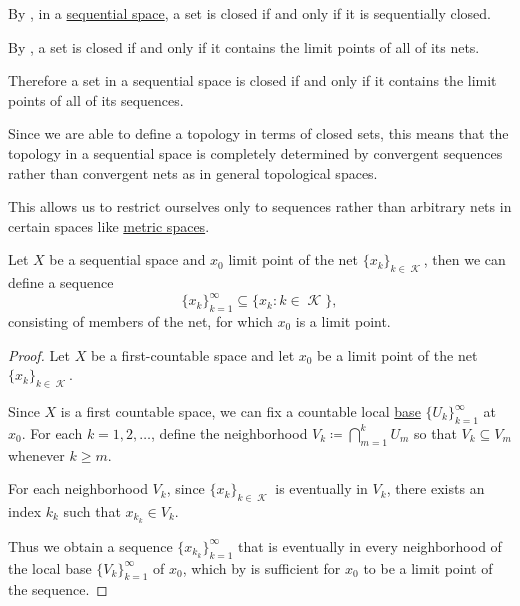 \begin{remark}\label{rem:sequential_spaces}
  By , in a \hyperref[def:sequential_space]{sequential space}, a set is closed if and only if it is sequentially closed.

  By , a set is closed if and only if it contains the limit points of all of its nets.

  Therefore a set in a sequential space is closed if and only if it contains the limit points of all of its sequences.

  Since we are able to define a topology in terms of closed sets, this means that the topology in a sequential space is completely determined by convergent sequences rather than convergent nets as in general topological spaces.

  This allows us to restrict ourselves only to sequences rather than arbitrary nets in certain spaces like \hyperref[def:metric_space]{metric spaces}.
\end{remark}

\begin{lemma}\label{thm:sequential_space_convergence}
  Let \( X \) be a sequential space and \( x_0 \) limit point of the net \( \{ x_k \}_{k \in \mscrK} \), then we can define a sequence
  \begin{equation*}
    \{ x_k \}_{k=1}^\infty \subseteq \{ x_k \colon k \in \mscrK \},
  \end{equation*}
  consisting of members of the net, for which \( x_0 \) is a limit point.
\end{lemma}
\begin{proof}
  Let \( X \) be a first-countable space and let \( x_0 \) be a limit point of the net \( \{ x_k \}_{k \in \mscrK} \).

  Since \( X \) is a first countable space, we can fix a countable local \hyperref[def:topological_local_base]{base} \( \{ U_k \}_{k=1}^\infty \) at \( x_0 \). For each \( k = 1, 2, \ldots \), define the neighborhood \( V_k \coloneqq \bigcap_{m=1}^k U_m \) so that \( V_k \subseteq V_m \) whenever \( k \geq m \).

  For each neighborhood \( V_k \), since \( \{ x_k \}_{k \in \mscrK} \) is eventually in \( V_k \), there exists an index \( k_k \) such that \( x_{k_k} \in V_k \).

  Thus we obtain a sequence \( \{ x_{k_k} \}_{k=1}^\infty \) that is eventually in every neighborhood of the local base \( \{ V_k \}_{k=1}^\infty \) of \( x_0 \), which by  is sufficient for \( x_0 \) to be a limit point of the sequence.
\end{proof}

